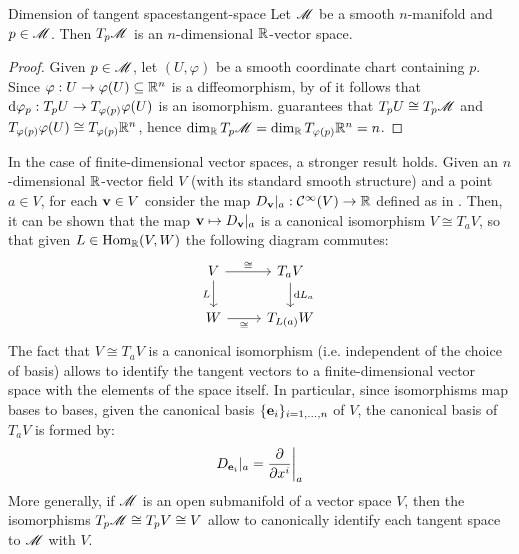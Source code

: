 \begin{theorem}{Dimension of tangent spaces}{tangent-space}
  Let $ \mathscr{M} $ be a smooth $ n $-manifold and $ p \in \mathscr{M} $. Then $ T_p\mathscr{M} $ is an $ n $-dimensional $ \mathbb{R} $-vector space.
\end{theorem}

\begin{proofbox}
  \begin{proof}
    Given $ p \in \mathscr{M} $, let $ (U,\varphi) $ be a smooth coordinate chart containing $ p $. Since $ \varphi : U \rightarrow \varphi(U) \subseteq \mathbb{R}^n $ is a diffeomorphism, by  of  it follows that $ \mathrm{d} \varphi_p : T_pU \rightarrow T_{\varphi(p)}\varphi(U) $ is an isomorphism.  guarantees that $ T_pU \cong T_p\mathscr{M} $ and $ T_{\varphi(p)}\varphi(U) \cong T_{\varphi(p)}\mathbb{R}^n $, hence $ \dim_{\mathbb{R}} T_p\mathscr{M} = \dim_{\mathbb{R}} T_{\varphi(p)}\mathbb{R}^n = n $.
  \end{proof}
\end{proofbox}

In the case of finite-dimensional vector spaces, a stronger result holds. Given an $ n $-dimensional $ \mathbb{R} $-vector field $ V $ (with its standard smooth structure) and a point $ a \in V $, for each $ \mathbf{v} \in V $ consider the map $ D_{\mathbf{v}}\vert_a : \mathcal{C}^{\infty}(V) \rightarrow \mathbb{R} $ defined as in . Then, it can be shown that the map $ \mathbf{v} \mapsto D_{\mathbf{v}}\vert_a $ is a canonical isomorphism $ V \cong T_aV $, so that given $ L \in \operatorname{Hom}_{\mathbb{R}}(V,W) $ the following diagram commutes:
\begin{equation}
  \begin{tikzcd}
    V \ar[r , "\cong"] \ar[d , "L" , swap] & T_aV \ar[d , "\dd L_a"] \\
    W \ar[r , "\cong" , swap] & T_{L(a)} W
  \end{tikzcd}
  \label{eq:canonical-isomorphism-vector-spaces}
\end{equation}
The fact that $ V \cong T_aV $ is a canonical isomorphism (i.e. independent of the choice of basis) allows to identify the tangent vectors to a finite-dimensional vector space with the elements of the space itself. In particular, since isomorphisms map bases to bases, given the canonical basis $ \{\mathbf{e}_i\}_{i = 1,\dots,n} $ of $ V $, the canonical basis of $ T_aV $ is formed by:
\begin{equation}
  D_{\mathbf{e}_i}\vert_a = \frac{\partial}{\partial x^i}\bigg\vert_a
  \label{eq:canonical-tangent-basis}
\end{equation}
More generally, if $ \mathscr{M} $ is an open submanifold of a vector space $ V $, then the isomorphisms $ T_p\mathscr{M} \cong T_pV \cong V $ allow to canonically identify each tangent space to $ \mathscr{M} $ with $ V $.

